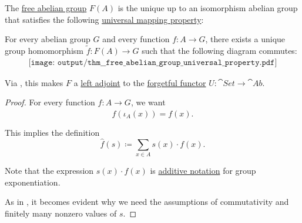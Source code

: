 \begin{proposition}\label{thm:free_abelian_group_universal_property}
  The \hyperref[def:free_abelian_group]{free abelian group} \( F(A) \) is the unique up to an isomorphism abelian group that satisfies the following \hyperref[rem:universal_mapping_property]{universal mapping property}:
  \begin{displayquote}
    For every abelian group \( G \) and every function \( f: A \to G \), there exists a unique group homomorphism \( \widetilde{f}: F(A) \to G \) such that the following diagram commutes:
    \begin{equation}\label{eq:thm:free_abelian_group_universal_property/diagram}
      \begin{aligned}
        \texttt{[image: output/thm\_\_free\_abelian\_group\_universal\_property.pdf]}
      \end{aligned}
    \end{equation}
  \end{displayquote}

  Via , this makes \( F \) a \hyperref[def:category_adjunction]{left adjoint} to the \hyperref[def:concrete_category]{forgetful functor} \( U: \cat{Set} \to \cat{Ab} \).
\end{proposition}
\begin{proof}
  For every function \( f: A \to G \), we want
  \begin{equation*}
    \widehat{f}(\iota_A(x)) = f(x).
  \end{equation*}

  This implies the definition
  \begin{equation*}
    \widehat{f}(s) \coloneqq \sum_{x \in A} s(x) \cdot f(x).
  \end{equation*}

  Note that the expression \( s(x) \cdot f(x) \) is \hyperref[rem:additive_magma/multiplication]{additive notation} for group exponentiation.

  As in , it becomes evident why we need the assumptions of commutativity and finitely many nonzero values of \( s \).
\end{proof}
